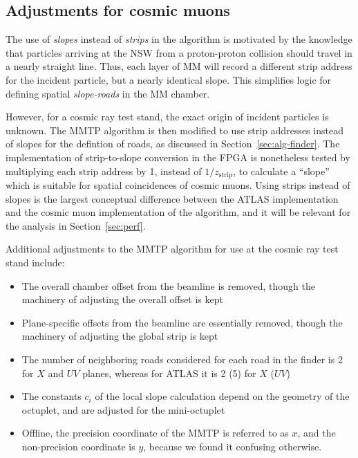 \subsection{Adjustments for cosmic muons}
\label{sec:alg-crts}

The use of \textit{slopes} instead of \textit{strips} in the algorithm is motivated by the knowledge that particles arriving at the NSW from a proton-proton collision should travel in a nearly straight line. Thus, each layer of MM will record a different strip address for the incident particle, but a nearly identical slope. This simplifies logic for defining spatial \textit{slope-roads} in the MM chamber.

However, for a cosmic ray test stand, the exact origin of incident particles is unknown. The MMTP algorithm is then modified to use strip addresses instead of slopes for the defintion of roads, as discussed in Section~\ref{sec:alg-finder}. The implementation of strip-to-slope conversion in the FPGA is nonetheless tested by multiplying each strip address by 1, instead of $1/z_\text{strip}$, to calculate a ``slope'' which is suitable for spatial coincidences of cosmic muons. Using strips instead of slopes is the largest conceptual difference between the ATLAS implementation and the cosmic muon implementation of the algorithm, and it will be relevant for the analysis in Section~\ref{sec:perf}.

Additional adjustments to the MMTP algorithm for use at the cosmic ray test stand include:

\begin{itemize}
  \item The overall chamber offset from the beamline is removed, though the machinery of adjusting the overall offset is kept
  \item Plane-specific offsets from the beamline are essentially removed, though the machinery of adjusting the global strip is kept
  \item The number of neighboring roads considered for each road in the finder is 2 for $X$ and $UV$ planes, whereas for ATLAS it is 2 (5) for $X$ ($UV$)
  \item The constants $c_i$ of the local slope calculation depend on the geometry of the octuplet, and are adjusted for the mini-octuplet
  \item Offline, the precision coordinate of the MMTP is referred to as $x$, and the non-precision coordinate is $y$, because we found it confusing otherwise.
\end{itemize}


